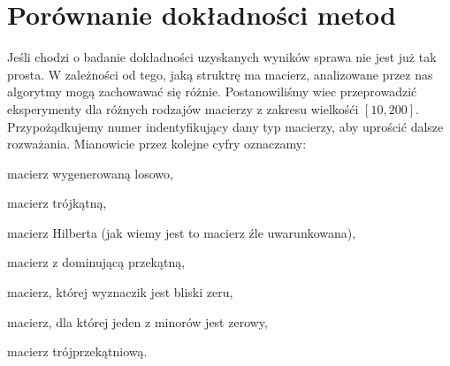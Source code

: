 \section{Porównanie dokładności metod}
Jeśli chodzi o badanie dokładności uzyskanych wyników sprawa nie jest już tak
prosta. W zależności od tego, jaką struktrę ma macierz, analizowane przez nas
algorytmy mogą zachowawać się różnie. Postanowiliśmy wiec przeprowadzić
eksperymenty dla różnych rodzajów macierzy z zakresu wielkośći $[10, 200]$. Przypożądkujemy numer indentyfikujący
dany typ macierzy, aby uprościć dalsze rozważania. Mianowicie przez kolejne cyfry
oznaczamy:
\begin{myenumerate}
\item macierz wygenerowaną losowo,
\item macierz trójkątną,
\item macierz Hilberta (jak wiemy jest to macierz źle uwarunkowana),
\item macierz z dominującą przekątną,
\item macierz, której wyznaczik jest bliski zeru,
\item macierz, dla której jeden z minorów jest zerowy,
\item macierz trójprzekątniową.
\end{myenumerate}

